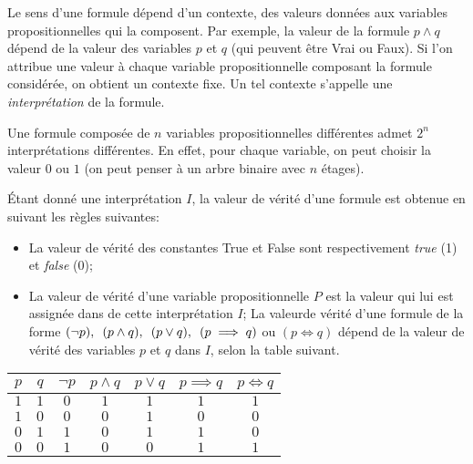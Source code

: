 Le sens d'une formule dépend d'un contexte, des valeurs données aux variables propositionnelles qui la composent. Par exemple, la valeur de la formule $p\land q$ dépend de la valeur des variables $p$ et $q$ (qui peuvent être Vrai ou Faux). Si l'on attribue une valeur à chaque variable propositionnelle composant la formule considérée, on obtient un contexte fixe. Un tel contexte s'appelle une \textit{interprétation} de la formule.
\smallskip

Une formule composée de $n$ variables propositionnelles différentes admet $2^n$ interprétations différentes. En effet, pour chaque variable, on peut choisir la valeur $0$ ou $1$ (on peut penser à un arbre binaire avec $n$ étages). 
\smallskip

Étant donné une interprétation $I$, la valeur de vérité d'une formule est obtenue en suivant les règles suivantes:
\begin{itemize}
\item La valeur de  vérité des constantes True et False sont respectivement \textit{true} (1) et \textit{false} (0);
\item La valeur de vérité d'une variable propositionnelle $P$ est la valeur qui lui est assignée dans de cette interprétation $I$;
La valeurde vérité d'une formule de la forme $(\neg p),\enskip (p\land q), \enskip (p\lor q),\enskip (p\implies q)$ ou $(p\Leftrightarrow q)$ dépend de la valeur de vérité des variables $p$ et $q$ dans $I$, selon la table suivant.
\end{itemize}
\begin{center}
\begin{tabular}{|c|c||c|c|c|c|c|}
\hline
$p$&$q$&$\neg p$&$p\land q$&$p\lor q$&$p\implies q$&$p \Leftrightarrow q$ \\ \hline\hline
$1$&$1$&$0$&$1$&$1$&$1$&$1$ \\ \hline
$1$&$0$&$0$&$0$&$1$&$0$&$0$ \\ \hline
$0$&$1$&$1$&$0$&$1$&$1$&$0$ \\ \hline
$0$&$0$&$1$&$0$&$0$&$1$&$1$ \\ \hline
\end{tabular}
\end{center}


